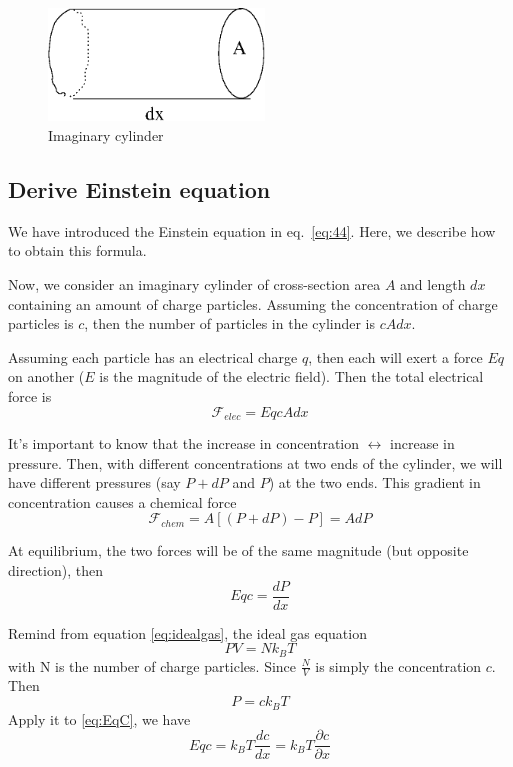 \begin{figure}[htb]
  \centerline{\includegraphics[height=3cm]{./images/cyllinder.eps}}
  \caption{Imaginary cylinder}\label{fig:cyllinder}
\end{figure}

\subsection{Derive Einstein equation}
\label{sec:derive-einst-equat}

We have introduced the Einstein equation in eq.~\eqref{eq:44}. Here,
we describe how to obtain this formula.

Now, we consider an imaginary cylinder of cross-section area $A$ and
length $dx$ containing an amount of charge particles. Assuming the
concentration of charge particles is $c$, then the number of particles
in the cylinder is $cAdx$.

Assuming each particle has an electrical charge $q$, then each will
exert a force $Eq$ on another ($E$ is the magnitude of the electric
field). Then the total electrical force is
\begin{equation}
  \mathcal{F}_{elec} = EqcAdx
\end{equation}

It's important to know that the increase in concentration
$\longleftrightarrow$ increase in pressure.  Then, with different
concentrations at two ends of the cylinder, we will have different
pressures (say $P+dP$ and $P$) at the two ends. This gradient in
concentration causes a chemical force
\begin{equation}
  \mathcal{F}_{chem} = A[(P+dP) - P] = AdP
\end{equation}

At equilibrium, the two forces will be of the same magnitude (but
opposite direction), then
\begin{equation}\label{eq:EqC}
  Eqc = \frac{dP}{dx}
\end{equation}

Remind from equation \eqref{eq:idealgas}, the ideal gas equation
\begin{equation}
  PV = Nk_BT
\end{equation}
with N is the number of charge particles. Since $\frac{N}{V}$ is
simply the concentration $c$.  Then
\begin{equation}
  P = ck_BT
\end{equation}
Apply it to \eqref{eq:EqC}, we have
\begin{equation}
  Eqc = k_BT\frac{dc}{dx} = k_BT\frac{\partial c}{\partial x}
\end{equation}

